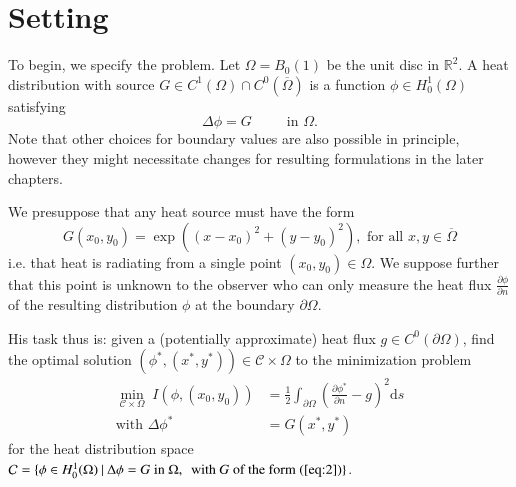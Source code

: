 \section{Setting}
To begin, we specify the problem. Let $\Omega = B_0(1)$ be the unit disc in $\mathbb R^2$. A heat distribution with source $G\in C^1(\Omega)\cap C^0(\overline{\Omega})$ is a function $\phi\in H^1_0(\Omega)$ satisfying
\begin{equation}\label{eq:1}
	\Delta \phi = G 
	\hspace{30pt}\text{in }\Omega.
\end{equation}
Note that other choices for boundary values are also possible in principle, however they might necessitate changes for resulting formulations in the later chapters.

We presuppose that any heat source must have the form
\begin{equation}\label{eq:2}
	G(x_0,y_0) = \exp\left((x-x_0)^2+(y-y_0)^2\right),\text{ for all }x,y\in\overline{\Omega}
\end{equation}
i.e. that heat is radiating from a single point $(x_0,y_0)\in\Omega$. We suppose further that this point is unknown to the observer who can only measure the heat flux $\frac{\partial \phi}{\partial n}$ of the resulting distribution $\phi$ at the boundary $\partial\Omega$.

His task thus is: given a (potentially approximate) heat flux $g\in C^0(\partial\Omega)$, find the optimal solution $\left(\phi^*,(x^*,y^*)\right)\in \mathcal C\times\Omega$ to the minimization problem
\begin{align}\label{eq:3}
	 \underset{\mathcal C\times\Omega}{\min}\;I(\phi,(x_0,y_0))
	&=\frac{1}{2} 
		\int_{\partial\Omega}
			\left( \frac{\partial \phi^*}{\partial n} - g\right)^2 \mathrm{d}s\\
	\text{with }\Delta \phi^* 
	&= G(x^*,y^*)\label{eq:4}
\end{align}
for the heat distribution space $\mathcal C = \{ \phi\in H^1_0(\Omega)\:|\:\Delta \phi = G\text{ in }\Omega,\:\text{ with $G$ of the form (\ref{eq:2})}\}$.